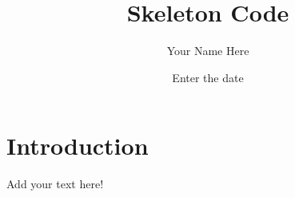 \documentclass{article}
\title{Skeleton Code}
\author{Your Name Here}
\date{Enter the date}
\begin{document}
\maketitle

\section{Introduction}

Add your text here!
\end{document}
